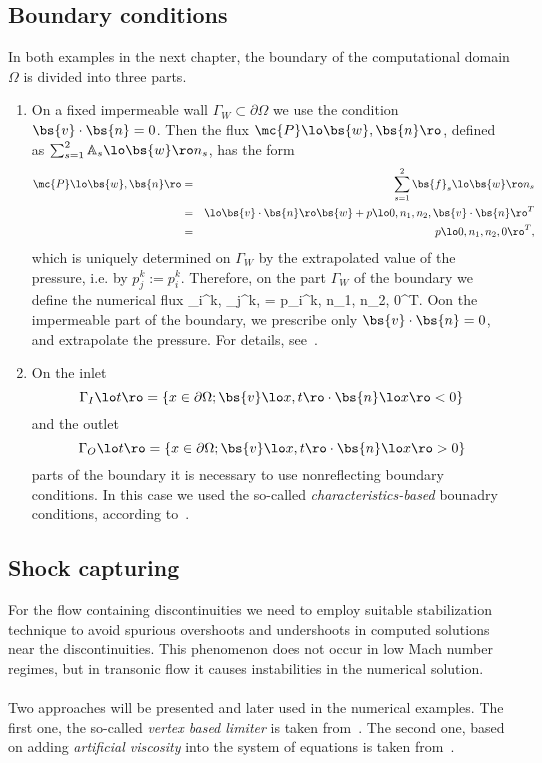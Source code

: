 \subsection{Boundary conditions}
\label{sec:bnd}
In both examples in the next chapter, the boundary of the computational domain $\Omega$ is divided into three parts.
\begin{enumerate}
\item On a fixed impermeable wall $\Gamma_W\subset\partial\Omega$ we use the condition $\bs{v}\cdot\bs{n} = 0$. Then the flux $\mc{P}\lo\bs{w},\bs{n}\ro$, defined as $\sum_{s=1}^2\mathbb{A}_s\lo\bs{w}\ro n_s$, has the form
\begin{eqnarray}
\mc{P}\lo\bs{w},\bs{n}\ro & = & \sum_{s=1}^2\bs{f}_s\lo\bs{w}\ro n_s \\ & = & \lo\bs{v}\cdot\bs{n}\ro\bs{w} + p \lo 0, n_1, n_2, \bs{v}\cdot\bs{n}\ro^T \\ & = & p\lo 0, n_1, n_2, 0\ro^T,
\end{eqnarray}
which is uniquely determined on $\Gamma_W$ by the extrapolated value of the pressure, i.e. by $p_j^k := p_i^k$. Therefore, on the part $\Gamma_W$ of the boundary we define the numerical flux
\be
{}\lo{}_i^k, _j^k, \ro = p_i^k, n_1, n_2, 0\ro^T.
\ee
Oon the impermeable part of the boundary, we prescribe only $\bs{v}\cdot\bs{n} = 0$, and extrapolate the pressure. For details, see~\cite{hyp06}.
\item
On the inlet
$$
\Gamma_I\lo t \ro = \left\{x\in\partial\Omega; \bs{v}\lo x, t\ro \cdot \bs{n}\lo x \ro < 0\right\}
$$
and the outlet
$$
\Gamma_O\lo t \ro = \left\{x\in\partial\Omega; \bs{v}\lo x, t\ro \cdot \bs{n}\lo x \ro > 0\right\}
$$
parts of the boundary it is necessary to use nonreflecting boundary conditions. In this case we used the so-called \emph{characteristics-based} bounadry conditions, according to~\cite{hyp06}.
\end{enumerate}
\subsection{Shock capturing}
\label{subsec:shock}
For the flow containing discontinuities we need to employ suitable stabilization technique to avoid spurious overshoots and undershoots in computed solutions near the discontinuities. This phenomenon does not occur in low Mach number regimes, but in transonic flow it causes instabilities in the numerical solution.
\paragraph{}
Two approaches will be presented and later used in the numerical examples. The first one, the so-called \emph{vertex based limiter} is taken from~\cite{Kuzmin}. The second one, based on adding \emph{artificial viscosity} into the system of equations is taken from~\cite{hyp06}.
